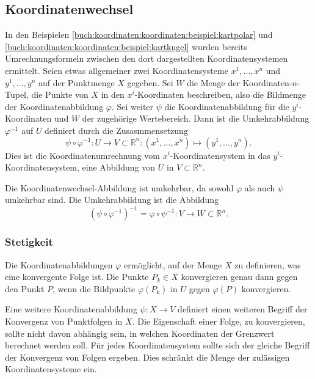 
%
%
\subsection{Koordinatenwechsel
\label{buch:koordinaten:koordinaten:subsection:koordinatenwechsel}}
In den Beispielen
\ref{buch:koordinaten:koordinaten:beispiel:kartpolar}
und
\ref{buch:koordinaten:koordinaten:beispiel:kartkugel}
wurden bereits Umrechnungsformeln zwischen den dort dargestellten
Koordinatensystemen ermittelt.
Seien etwas allgemeiner zwei Koordinatensysteme $x^1,\dots,x^n$
und $y^1,\dots,y^n$ auf der Punktmenge $X$ gegeben.
Sei $W$ die Menge der Koordinaten-$n$-Tupel, die Punkte von $X$
in den $x^i$-Koordinaten beschreiben, also die Bildmenge der
Koordinatenabbildung $\varphi$.
Sei weiter $\psi$ die Koordinatenabbildung für die $y^i$-Koordinaten
und $W$ der zugehörige Wertebereich.
Dann ist die Umkehrabbildung $\varphi^{-1}$ auf $U$ definiert durch die
Zusasmmensetzung
\[
\psi
\circ
\varphi^{-1}
\colon
U\to V\subset\mathbb{R}^n
:
(x^1,\dots,x^n)
\mapsto
(y^1,\dots,y^n).
\]
Dies ist die Koordinatenumrechnung vom $x^i$-Koordinatensystem in
das $y^i$-Koordinatensystem, eine Abbildung von $U$ in $V\subset\mathbb{R}^n$.


Die Koordinatenwechsel-Abbildung ist umkehrbar, da sowohl $\varphi$
als auch $\psi$ umkehrbar sind.
Die Umkehrabbildung ist die Abbildung
\[
(\psi\circ\varphi^{-1})^{-1}
=
\varphi\circ\psi^{-1}
\colon
V\to W \subset \mathbb{R}^n.
\]
%
%
\subsubsection{Stetigkeit}
Die Koordinatenabbildungen $\varphi$ ermöglicht, auf der Menge
$X$ zu definieren, was eine konvergente Folge ist.
Die Punkte $P_k\in X$ konvergieren genau dann gegen den Punkt $P$,
wenn die Bildpunkte $\varphi(P_k)$ in $U$ gegen $\varphi(P)$
konvergieren.

Eine weitere Koordinatenabbildung $\psi\colon X\to V$ definiert einen
weiteren Begriff der Konvergenz von Punktfolgen in $X$.
Die Eigenschaft einer Folge, zu konvergieren, sollte nicht davon 
abhängig sein, in welchen Koordinaten der Grenzwert berechnet
werden soll.
Für jedes Koordinatensystem sollte sich der gleiche Begriff der
Konvergenz von Folgen ergeben.
Dies schränkt die Menge der zulässigen Koordinatensysteme ein.

